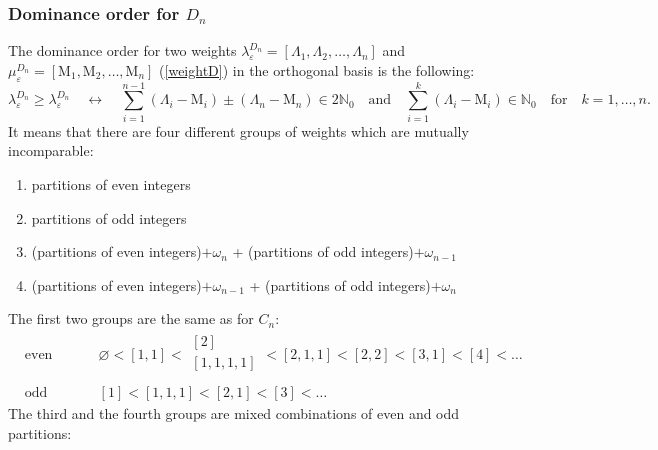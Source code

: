 \documentclass{article}
\def\ve{\varepsilon}
\begin{document}
\subsubsection{Dominance order for $D_n$}
The dominance order for two weights $ \lambda^{D_n}_{\ve} = [\Lambda_1, \Lambda_2, \dots,\Lambda_n] $ and $\mu^{D_n}_{\ve} =[\text{M}_1, \text{M}_2, \dots, \text{M}_n] $ (\ref{weightD}) in the orthogonal basis is the following:
\begin{equation}
   \lambda^{D_n}_{\ve} \geq \lambda^{D_n}_{\ve} \quad \longleftrightarrow \quad \sum_{i=1}^{n-1} (\Lambda_i-\text{M}_i)\pm (\Lambda_n-\text{M}_n) \in 2\mathbb{N}_0 \quad \text{and} \quad \sum_{i=1}^{k}(\Lambda_i - \text{M}_i) \in \mathbb{N}_0\quad\text{for}\quad k=1,\dots,n.
   \label{DominanceOrderD}
\end{equation}
It means that there are four different groups of weights which are mutually incomparable:
\begin{enumerate}
\setlength{\itemsep}{-3pt} %
    \item partitions of even integers
    \item partitions of odd integers
    \item (partitions of even integers)$+\omega_n$ + (partitions of odd integers)$+\omega_{n-1}$
    \item (partitions of even integers)$+\omega_{n-1}$ + (partitions of odd integers)$+\omega_{n}$
\end{enumerate}
The first two groups are the same as for $C_n$:
\begin{equation}
    \begin{aligned}
     & \text{even integers:}
      & &  \varnothing < [1,1]<
        \begin{array}{c}
           [2] \\[0.2pt]
           [1,1,1,1] \\
      \end{array} <
      [2,1,1]<[2,2]<[3,1]<[4]< \dots\\
       & \text{odd integers:}
      & &  [1] < [1,1,1] < [2,1] < [3] < \dots
    \end{aligned}
\end{equation}
The third and the fourth groups are mixed combinations of even and odd partitions:
\end{document}
